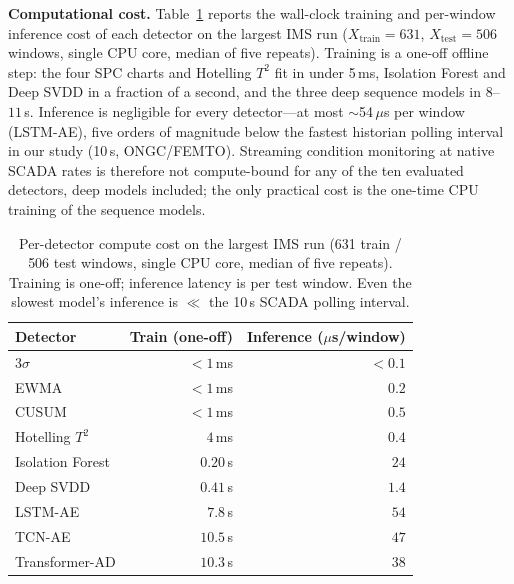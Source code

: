 \documentclass[journal]{IEEEtran}
\begin{document}
\textbf{Computational cost.} Table~\ref{tab:cost} reports the wall-clock training
and per-window inference cost of each detector on the largest IMS run
($X_{\mathrm{train}}{=}631$, $X_{\mathrm{test}}{=}506$ windows, single CPU core,
median of five repeats). Training is a one-off offline step: the four SPC charts
and Hotelling $T^2$ fit in under 5\,ms, Isolation Forest and Deep SVDD in a
fraction of a second, and the three deep sequence models in $8$--$11$\,s. Inference
is negligible for every detector---at most $\sim$54\,$\mu$s per window (LSTM-AE),
five orders of magnitude below the fastest historian polling interval in our study
(10\,s, ONGC/FEMTO). Streaming condition monitoring at native SCADA rates is
therefore not compute-bound for any of the ten evaluated detectors, deep models included;
the only practical cost is the one-time CPU training of the sequence models.

\begin{table}[t]
\caption{Per-detector compute cost on the largest IMS run (631 train / 506 test
windows, single CPU core, median of five repeats). Training is one-off; inference
latency is per test window. Even the slowest model's inference is $\ll$ the 10\,s
SCADA polling interval.}
\label{tab:cost}
\centering
\footnotesize
\setlength{\tabcolsep}{5pt}
\begin{tabular}{@{}lrr@{}}
\toprule
Detector & Train (one-off) & Inference ($\mu$s/window) \\
\midrule
3$\sigma$          & $<1$\,ms          & $<0.1$ \\
EWMA               & $<1$\,ms          & $0.2$ \\
CUSUM              & $<1$\,ms          & $0.5$ \\
Hotelling $T^2$    & $4$\,ms           & $0.4$ \\
Isolation Forest   & $0.20$\,s         & $24$ \\
Deep SVDD          & $0.41$\,s         & $1.4$ \\
LSTM-AE            & $7.8$\,s          & $54$ \\
TCN-AE             & $10.5$\,s         & $47$ \\
Transformer-AD     & $10.3$\,s         & $38$ \\
\bottomrule
\end{tabular}
\end{table}
\end{document}

